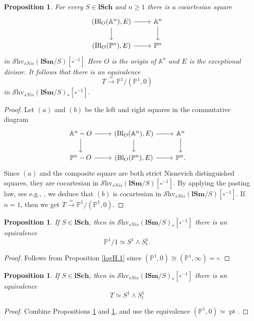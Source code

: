 \documentclass[11pt, a4paper]{amsart}
\newtheorem{prop}[thm]{Proposition}
\theoremstyle{definition}
\numberwithin{equation}{subsection}
\renewcommand{\P}{\mathbb{P}}
\newcommand{\A}{\mathbb{A}}
\newcommand{\lSch}{\mathbf{lSch}}
\newcommand{\lSm}{\mathbf{lSm}}
\newcommand{\pt}[1]{\mathrm{\pt}_{#1}}
\newcommand{\Blow}{{\mathrm{Bl}}}
\newcommand{\boxx}{\square}
\def\pt{\operatorname{pt}}
\newcommand{\infShv}{\mathcal{S}\mathrm{hv}}
\begin{document}
\begin{prop}
\label{logH.4}
For every $S\in \lSch$ and $n\geq 1$ there is a cocartesian square
\[
\begin{tikzcd}
(\Blow_O(\A^n),E)\ar[d]\ar[r]&
\A^n\ar[d]
\\
(\Blow_O(\P^n),E)\ar[r]&
\P^n
\end{tikzcd}
\]
in $\infShv_{sNis}(\lSm/S)[\boxx^{-1}]$
Here $O$ is the origin of $\A^n$ and $E$ is the exceptional divisor.
It follows that there is an equivalence
\[
T
\xrightarrow{\simeq}
\P^1/(\P^1,0)
\]
in $\infShv_{sNis}(\lSm/S)_\ast[\boxx^{-1}]$.
\end{prop}
\begin{proof}
Let $(a)$ and $(b)$ be the left and right squares in the commutative diagram
\[
\begin{tikzcd}
\A^n-O\ar[d]\ar[r]&
(\Blow_O(\A^n),E)\ar[d]\ar[r]&
\A^n\ar[d]
\\
\P^n-O\ar[r]&
(\Blow_O(\P^n),E)\ar[r]&
\P^n.
\end{tikzcd}
\]
Since $(a)$ and the composite square are  both strict Nisnevich distinguished squares, they are cocartesian in $\infShv_{sNis}(\lSm/S)[\boxx^{-1}]$.
By applying the pasting law, 
see e.g., \cite[Lemma 4.4.2.1]{HTT}, 
we deduce that $(b)$ is cocartesian in $\infShv_{sNis}(\lSm/S)[\boxx^{-1}]$.
If $n=1$, then we get $T \xrightarrow{\simeq} \P^1/(\P^1,0)$.
\end{proof}

\begin{prop}
\label{logH.2}
If $S\in \lSch$, 
then in  $\infShv_{sNis}(\lSm/S)_\ast[\boxx^{-1}]$ there is an equivalence
\[
\P^1/1 \simeq S^1\wedge S_t^1.
\]
\end{prop}
\begin{proof}
Follows from Proposition \ref{logH.1} since $(\P^1,0)\cong (\P^1,\infty)=\boxx$.
\end{proof}


\begin{prop}
\label{logH.5}
If $S\in \lSch$, 
then in $\infShv_{sNis}(\lSm/S)_\ast[\boxx^{-1}]$ there is an equivalence
\[
T
\simeq
S^1\wedge S_t^1
\]
\end{prop}
\begin{proof}
Combine Propositions \ref{logH.4} and \ref{logH.2}, and use the equivalence $(\P^1,0)\simeq \pt$.
\end{proof}
\end{document}
